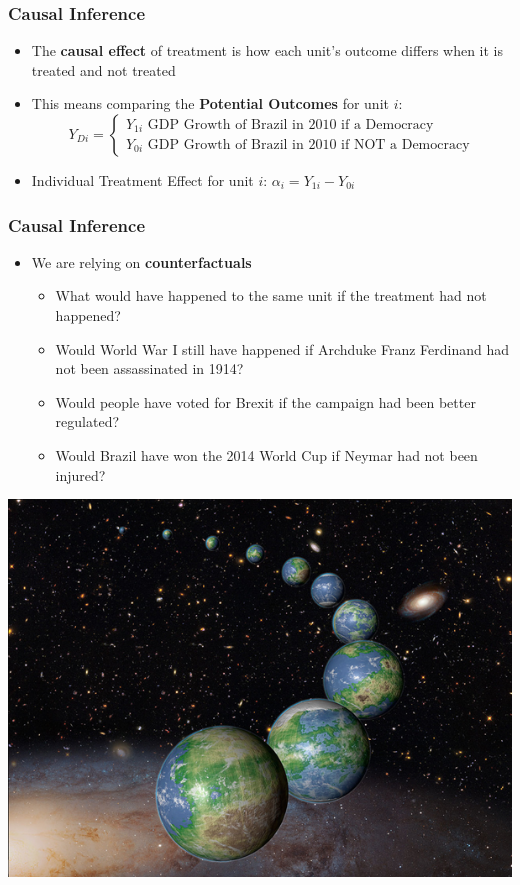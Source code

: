 \documentclass[xcolor=x11names,compress]{beamer}\usepackage[]{graphicx}\usepackage[]{color}
\renewcommand{\(}{\begin{columns}}
\renewcommand{\)}{\end{columns}}
\newcommand{\<}[1]{\begin{column}{#1}}
\renewcommand{\>}{\end{column}}
\begin{document}
\begin{frame}
\frametitle{Causal Inference}
\begin{itemize}
\item The \textbf{causal effect} of treatment is how each unit's outcome differs when it is treated and not treated
\item This means comparing the \textbf{Potential Outcomes} for unit $i$:
\[
Y_{Di} = 
\begin{cases}
Y_{1i}\text{   GDP Growth of Brazil in 2010 if a Democracy} \\
Y_{0i}\text{   GDP Growth of Brazil in 2010 if NOT a Democracy}
\end{cases}
\]
\item Individual Treatment Effect for unit $i$: $\alpha_i = Y_{1i} - Y_{0i}$
\end{itemize}
\end{frame}

\begin{frame}
\frametitle{Causal Inference}
\begin{itemize}
\item We are relying on \textbf{counterfactuals}
\pause
\begin{itemize}
\item What would have happened to the same unit if the treatment had not happened?
\pause
\item Would World War I still have happened if Archduke Franz Ferdinand had not been assassinated in 1914?
\pause
\item Would people have voted for Brexit if the campaign had been better regulated? 
\pause
\item Would Brazil have won the 2014 World Cup if Neymar had not been injured?
\pause
\end{itemize}
\end{itemize}
\end{frame}

\includegraphics[width=1\textwidth]{figure/Multiverse.png}
\end{document}
